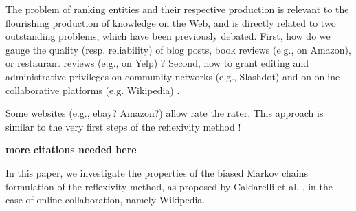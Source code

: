 %
%
%

The problem of ranking entities and their respective production is relevant to the 
flourishing production of knowledge on the Web, and is directly related to two outstanding problems, which have been previously debated. First, how do we gauge the quality (resp. reliability) of blog posts, book reviews (e.g., on Amazon), or restaurant reviews (e.g., on Yelp) ?  Second,  how to grant editing and administrative privileges on community networks (e.g., Slashdot) and on online collaborative platforms (e.g. Wikipedia) \cite{halfaker2013}. 

Some websites (e.g., ebay? Amazon?) allow rate the rater. This approach is similar to the very first steps of the reflexivity method ! \cite{citation needed.}

{\bf more citations needed here}

In this paper, we investigate the properties of the biased Markov chains formulation of the reflexivity method, as proposed by Caldarelli et al. \cite{caldarelli2012network}, in the case of online collaboration, namely Wikipedia.

